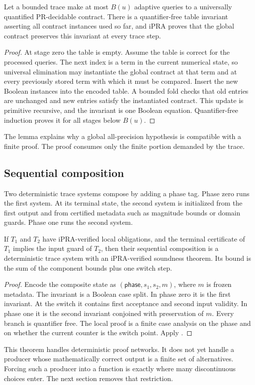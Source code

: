 \begin{lemma}
\label{lem:adaptive-instantiation}
Let a bounded trace make at most $B(u)$ adaptive queries to a universally quantified PR-decidable contract.  There is a quantifier-free table invariant asserting all contract instances used so far, and iPRA proves that the global contract preserves this invariant at every trace step.
\end{lemma}

\begin{proof}
At stage zero the table is empty.  Assume the table is correct for the processed queries.  The next index is a term in the current numerical state, so universal elimination may instantiate the global contract at that term and at every previously stored term with which it must be compared.  Insert the new Boolean instances into the encoded table.  A bounded fold checks that old entries are unchanged and new entries satisfy the instantiated contract.  This update is primitive recursive, and the invariant is one Boolean equation.  Quantifier-free induction proves it for all stages below $B(u)$.
\end{proof}

The lemma explains why a global all-precision hypothesis is compatible with a finite proof.  The proof consumes only the finite portion demanded by the trace.

\subsection{Sequential composition}

Two deterministic trace systems compose by adding a phase tag.  Phase zero runs the first system.  At its terminal state, the second system is initialized from the first output and from certified metadata such as magnitude bounds or domain guards.  Phase one runs the second system.

\begin{theorem}
\label{thm:det-compose}
If $T_1$ and $T_2$ have iPRA-verified local obligations, and the terminal certificate of $T_1$ implies the input guard of $T_2$, then their sequential composition is a deterministic trace system with an iPRA-verified soundness theorem.  Its bound is the sum of the component bounds plus one switch step.
\end{theorem}

\begin{proof}
Encode the composite state as $(\mathsf{phase},s_1,s_2,m)$, where $m$ is frozen metadata.  The invariant is a Boolean case split.  In phase zero it is the first invariant.  At the switch it contains first acceptance and second input validity.  In phase one it is the second invariant conjoined with preservation of $m$.  Every branch is quantifier free.  The local proof is a finite case analysis on the phase and on whether the current counter is the switch point.  Apply .
\end{proof}

This theorem handles deterministic proof networks.  It does not yet handle a producer whose mathematically correct output is a finite set of alternatives.  Forcing such a producer into a function is exactly where many discontinuous choices enter.  The next section removes that restriction.

